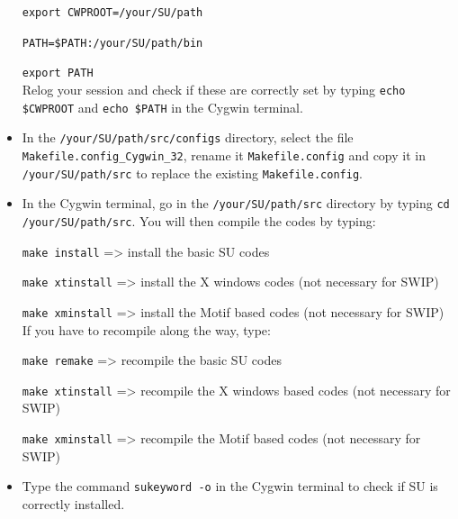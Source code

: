 \documentclass[twoside,a4paper]{article}
\begin{document}
\begin{itemize}
\verb|export CWPROOT=/your/SU/path|

\verb|PATH=$PATH:/your/SU/path/bin|

\verb|export PATH|\\[1ex]
Relog your session and check if these are correctly set by typing \verb|echo $CWPROOT| and \verb|echo $PATH| in the Cygwin terminal.

\item In the \verb|/your/SU/path/src/configs| directory, select the file \verb|Makefile.config_Cygwin_32|, rename it \verb|Makefile.config| and copy it in \verb|/your/SU/path/src| to replace the existing \verb|Makefile.config|.

\item In the Cygwin terminal, go in the \verb|/your/SU/path/src| directory by typing \verb|cd /your/SU/path/src|. You will then compile the codes by typing:

\verb|make install| => install the basic SU codes

\verb|make xtinstall| => install the X windows codes (not necessary for SWIP)

\verb|make xminstall| => install the Motif based codes (not necessary for SWIP)\\[1ex]
If you have to recompile along the way, type:

\verb|make remake| => recompile the basic SU codes

\verb|make xtinstall| => recompile the X windows based codes (not necessary for SWIP)

\verb|make xminstall| => recompile the Motif based codes (not necessary for SWIP)

\item Type the command \verb|sukeyword -o| in the Cygwin terminal to check if SU is correctly installed.
\end{itemize}
\end{document}
